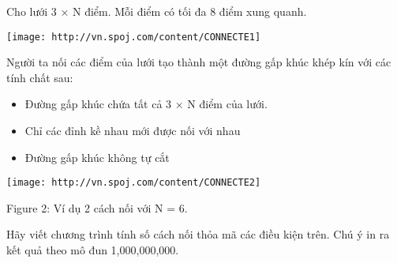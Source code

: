 Cho lưới 3 × N điểm. Mỗi điểm có tối đa 8 điểm xung quanh.


\texttt{[image: http://vn.spoj.com/content/CONNECTE1]}

Người ta nối các điểm của lưới tạo thành một đường gấp khúc khép kín với các tính chất sau:
\begin{itemize}
	\item Đường gấp khúc chứa tất cả 3 × N điểm của lưới.
	\item Chỉ các đỉnh kề nhau mới được nối với nhau
	\item Đường gấp khúc không tự cắt
\end{itemize}


\texttt{[image: http://vn.spoj.com/content/CONNECTE2]}

Figure 2: Ví dụ 2 cách nối với N = 6.

Hãy viết chương trình tính số cách nối thỏa mã các điều kiện trên. Chú ý in ra kết quả theo mô đun 1,000,000,000.